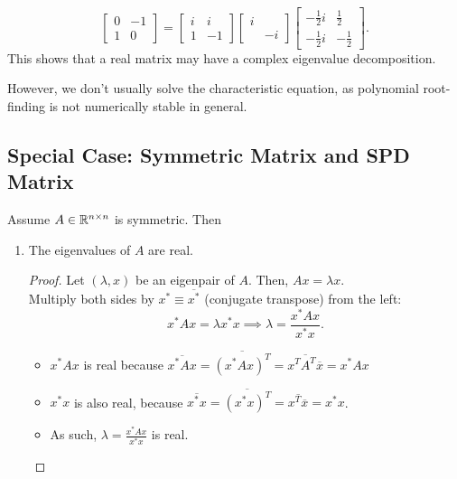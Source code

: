 \documentclass[../main/main.tex]{subfiles}
\begin{document}
\begin{example}
\[	\begin{bmatrix} 0&-1\\1&0 \end{bmatrix} =\begin{bmatrix} i&i\\1&-1 \end{bmatrix} \begin{bmatrix} i&\\&-i \end{bmatrix} \begin{bmatrix} -\frac{1}{2}i&\frac{1}{2}\\-\frac{1}{2}i&-\frac{1}{2} \end{bmatrix} 
	.\] This shows that a real matrix may have a complex eigenvalue decomposition.
\end{example}
\begin{remark}
However, we don't usually solve the characteristic equation, as polynomial root-finding is not numerically stable in general.
	
\end{remark}
\subsection{Special Case: Symmetric Matrix and SPD Matrix}
Assume $A\in \mathbb{R}^{n\times n}$ is symmetric. Then
\begin{enumerate}
	\item The eigenvalues of $A$ are real.
		\begin{proof}
			Let $\left( \lambda,x \right) $ be an eigenpair of $A$. Then, $Ax=\lambda x$.\\Multiply both sides by $x^{*}\equiv \overline{x^{*}}$ (conjugate transpose) from the left: \[
			x^{*}Ax=\lambda x^{*}x\implies \lambda= \frac{x^*Ax}{x^*x}
		.\] 
		\begin{itemize}
			\item $x^*Ax$ is real because $\overline{x^*Ax}=\overline{\left( x^*Ax \right)^{T} }=\overline{x^{T}A^{T}\overline{x}}=x^*Ax$
			\item $x^*x$ is also real, because $\overline{x^{*}x}=\overline{\left( x^*x \right) ^{T}}=\overline{x^{T}\overline{x}}=x^*x$.
			\item As such, $\lambda= \frac{x^*Ax}{x^*x}$ is real.
\end{itemize}
		\end{proof}
\end{enumerate}
\end{document}
